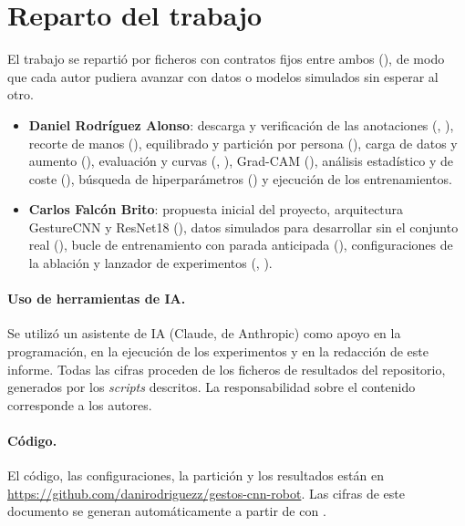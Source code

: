 \section*{Reparto del trabajo}

El trabajo se repartió por ficheros con contratos fijos entre ambos (), de
modo que cada autor pudiera avanzar con datos o modelos simulados sin esperar al otro.

\begin{itemize}
  \item \textbf{Daniel Rodríguez Alonso}: descarga y verificación de las anotaciones
    (, ), recorte de manos (),
    equilibrado y partición por persona (), carga de datos y aumento
    (), evaluación y curvas (, ),
    Grad-CAM (), análisis estadístico y de coste (), búsqueda
    de hiperparámetros () y ejecución de los entrenamientos.
  \item \textbf{Carlos Falcón Brito}: propuesta inicial del proyecto, arquitectura GestureCNN y
    ResNet18 (), datos simulados para desarrollar sin el conjunto real
    (), bucle de entrenamiento con parada anticipada (),
    configuraciones de la ablación y lanzador de experimentos (,
    ).
\end{itemize}

\paragraph{Uso de herramientas de IA.}
Se utilizó un asistente de IA (Claude, de Anthropic) como apoyo en la programación, en la
ejecución de los experimentos y en la redacción de este informe. Todas las cifras proceden de los
ficheros de resultados del repositorio, generados por los \emph{scripts} descritos. La
responsabilidad sobre el contenido corresponde a los autores.

\paragraph{Código.}
El código, las configuraciones, la partición y los resultados están en
\url{https://github.com/danirodriguezz/gestos-cnn-robot}. Las cifras de este documento se generan
automáticamente a partir de  con .
